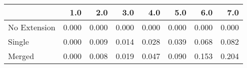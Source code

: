 \begin{tabular}{lrrrrrrr}
\toprule
{} &   1.0 &   2.0 &   3.0 &   4.0 &   5.0 &   6.0 &   7.0 \\
\midrule
No Extension & 0.000 & 0.000 & 0.000 & 0.000 & 0.000 & 0.000 & 0.000 \\
Single       & 0.000 & 0.009 & 0.014 & 0.028 & 0.039 & 0.068 & 0.082 \\
Merged       & 0.000 & 0.008 & 0.019 & 0.047 & 0.090 & 0.153 & 0.204 \\
\bottomrule
\end{tabular}
